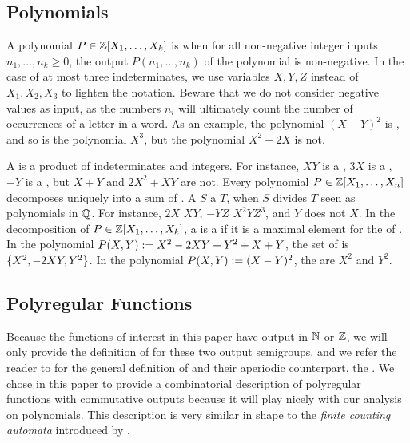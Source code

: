 \subsection{Polynomials} \AP A polynomial $P \in \mathbb{Z}[X_1, \dots, X_k]$ is
 when for all non-negative integer inputs $n_1, \dots, n_k
\geq 0$, the output  $P(n_1, \dots, n_k)$ of the polynomial is non-negative. In
the case of at most three indeterminates, we use variables $X,Y,Z$ instead of
$X_1, X_2, X_3$ to lighten the notation. Beware that we do not consider
negative values as input, as the numbers $n_i$ will ultimately count the number
of occurrences of a letter in a word. As an example, the polynomial $(X - Y)^2$
is , and so is the polynomial $X^3$, but the polynomial $X^2 -
2X$ is not.

\AP A  is a product of indeterminates and integers. For
instance, $XY$ is a , $3 X$ is a , $-Y$ is a
, but $X + Y$ and $2X^2 + XY$ are not. Every polynomial $P \in
\mathbb{Z}[X_1, \dots, X_n]$ decomposes uniquely into a sum of . A
 $S$  a  $T$, when $S$ divides $T$
seen as polynomials in $\mathbb{Q}$. For instance, $2X$  $XY$, $-YZ$
 $X^2 Y Z^3$, and $Y$ does not  $X$. In the
decomposition of $P \in \mathbb{Z}[X_1, \dots, X_k]$, a  is a
 if it is a maximal element for the  of . In the polynomial $P(X,Y) \mathrel{:=} X^2 - 2XY + Y^2
+ X + Y$, the set of  is $\mathopen{\{} X^2,  -2 XY,  Y^2 \mathclose{\}}$.
In the polynomial $P(X,Y) \mathrel{:=} (X - Y)^2$, the 
 are $X^2$ and $Y^2$.

\subsection{Polyregular Functions}
\label{polyregular:sec}

\AP Because the functions of interest in this paper have output in $\mathbb{N}$ or
$\mathbb{Z}$, we will only provide the definition of 
for these two output semigroups, and we refer the reader to \cite{BOKL19} for
the general definition of  and their aperiodic
counterpart, the . We chose in this
paper to provide a combinatorial description of polyregular functions with
commutative outputs because it will play nicely with our analysis on
polynomials. This description is very similar in shape to the \emph{finite
counting automata} introduced by \cite{SCHU62}. 

